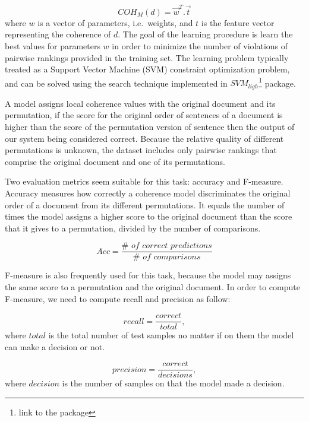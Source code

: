 \begin{equation}
COH_M(d) = \vec{w}^{T}.\vec{t}
\end{equation}
%
where $w$ is a vector of parameters, i.e.\ weights, and $t$ is the feature vector representing the coherence of $d$. 
The goal of the learning procedure is learn the best values for parameters $w$ in order to minimize the number of violations of pairwise rankings provided in the training set. 
The learning problem typically treated as a Support Vector Machine (SVM) constraint optimization problem, and can be solved using the search technique implemented in $SVM_{ligh}$\footnote{link to the package} \cite{joachims02} package. 

A model assigns local coherence values with the original document and its permutation, if the score for the original order of sentences of a document is higher than the score of the permutation version of sentence then the output of our system being considered correct. 
Because the relative quality of different permutations is unknown, the dataset includes only pairwise rankings that comprise the original document and one of its permutations.

Two evaluation metrics seem suitable for this task: accuracy and F-measure. 
Accuracy measures how correctly a coherence model discriminates the original order of a document from its different permutations.
It equals the number of times the model assigns a higher score to the original document than the score that it gives to a permutation, divided by the number of comparisons.

\begin{equation}
Acc  = \frac{\#\textit{ of correct predictions}}{\#\textit{ of comparisons}}
\end{equation}

F-measure is also frequently used for this task, because the model may assigns the same score to a permutation and the original document. 
In order to compute F-measure, we need to compute recall and precision as follow:

\begin{equation}
recall = \frac{correct}{total},
\end{equation}
where $total$ is the total number of test samples no matter if on them the model can make a decision or not. 

\begin{equation}
precision = \frac{correct}{decisions},
\end{equation}
where $decision$ is the number of samples on that the model made a decision.

